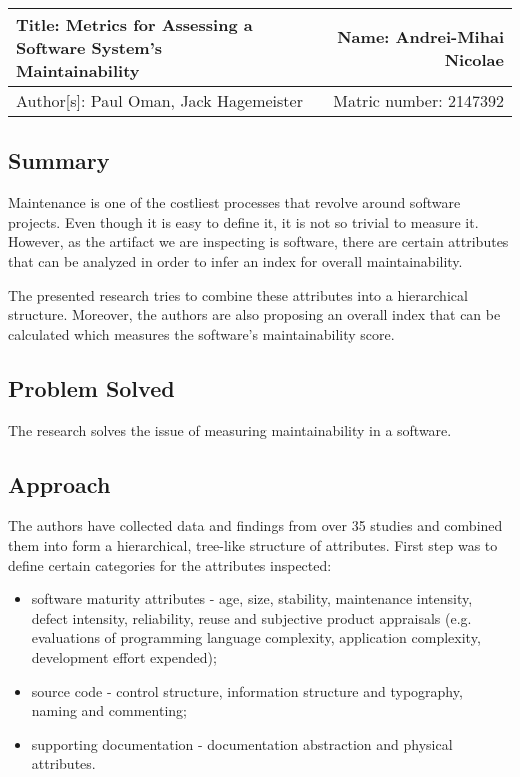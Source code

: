\documentclass[a4paper,12pt]{article}
\begin{document}
 \begin{center}
   \begin{tabular}{ | l | r | }
    \hline
    \parbox[t]{5cm}{Title: Metrics for Assessing a Software System's
                    \\  Maintainability} 
     & Name: Andrei-Mihai Nicolae \\ 
     \hline
     Author[s]: Paul Oman, Jack Hagemeister & Matric number: 2147392 \\
    \hline
   \end{tabular}
 \end{center}

\subsection{Summary}

Maintenance is one of the costliest processes that revolve around software projects.
Even though it is easy to define it, it is not so trivial to measure it. However, 
as the artifact we are inspecting is software, there are certain attributes that 
can be analyzed in order to infer an index for overall maintainability. 

The presented research tries to combine these attributes into a hierarchical structure.
Moreover, the authors are also proposing an overall index that can be calculated 
which measures the software's maintainability score.

\subsection{Problem Solved}

The research solves the issue of measuring maintainability in a software. 

\subsection{Approach}

The authors have collected data and findings from over 35 studies and combined
them into form a hierarchical, tree-like structure of attributes. First step was to
define certain categories for the attributes inspected:

\begin{itemize}
  \item software maturity attributes - age, size, stability, maintenance intensity,
    defect intensity, reliability, reuse and subjective product appraisals (e.g.  
    evaluations of programming language complexity, application complexity, 
    development effort expended);
  \item source code - control structure, information structure and typography, 
    naming and commenting;
  \item supporting documentation - documentation abstraction and physical attributes.
\end{itemize}
\end{document}
